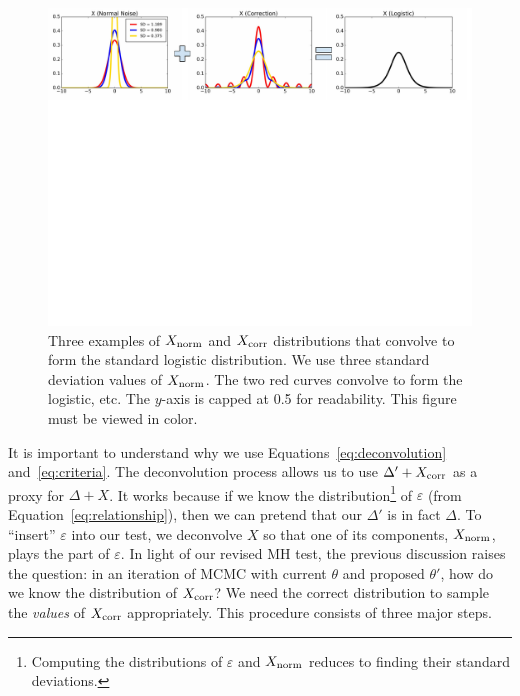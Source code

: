 \documentclass{article}
\begin{document}
\begin{figure}[t]
    \centering
    \includegraphics[width=1\textwidth]{mh_convolution_diagram_v2}
    \caption{
    Three examples of $X_{\rm norm}$ and $X_{\rm corr}$ distributions that convolve to form the
    standard logistic distribution. We use three standard deviation values of $X_{\rm norm}$. The
    two red curves convolve to form the logistic, etc. The $y$-axis is capped at 0.5 for
    readability. This figure must be viewed in color.
    }
    \label{fig:deconvolution}
\end{figure}

It is important to understand why we use Equations~\ref{eq:deconvolution} and~\ref{eq:criteria}. The
deconvolution process allows us to use $\Delta' + X_{\rm corr}$ as a proxy for $\Delta + X$. It
works because if we know the distribution\footnote{Computing the distributions of $\varepsilon$ and
$X_{\rm norm}$ reduces to finding their standard deviations.} of $\varepsilon$ (from
Equation~\ref{eq:relationship}), then we can pretend that our $\Delta'$ is in fact $\Delta$. To
``insert'' $\varepsilon$ into our test, we deconvolve $X$ so that one of its components, $X_{\rm
norm}$, plays the part of $\varepsilon$. In light of our revised MH test, the previous discussion
raises the question: in an iteration of MCMC with current $\theta$ and proposed $\theta'$, how do
we know the distribution of $X_{\rm corr}$? We need the correct distribution to sample the
\emph{values} of $X_{\rm corr}$ appropriately. This procedure consists of three major steps.
\end{document}
